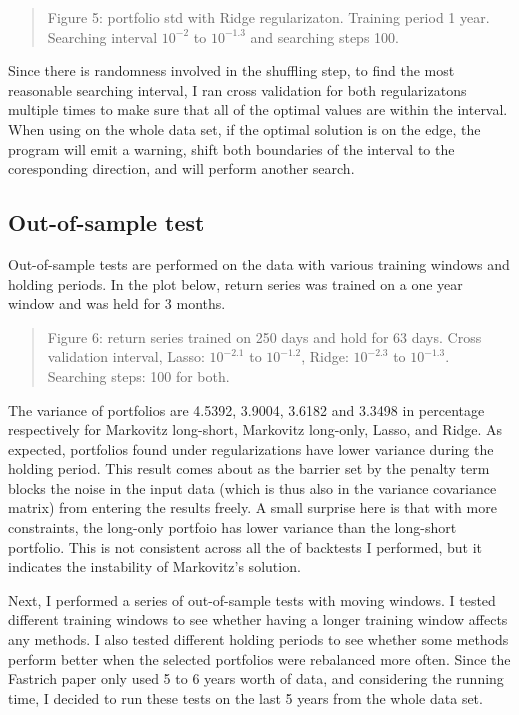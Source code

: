 \documentclass{article}
\newcommand{\ciapdf}[1]{\vspace*{-\parskip}\begin{center}\resizebox{0.75\textwidth}{!}{\texttt{[image: \#1]}}\end{center}}
\begin{document}
\begin{quote}
Figure 5: portfolio std with Ridge regularizaton. Training period 1 year. Searching
interval $10^{-2}$ to $10^{-1.3}$ and searching steps 100.
\end{quote}

Since there is randomness involved in the shuffling step, to find the most reasonable
searching interval, I ran cross validation for both regularizatons multiple times
to make sure that all of the optimal values are within the interval. When using on
the whole data set, if the optimal solution is on the edge, the program will
emit a warning, shift both boundaries of the interval to the coresponding
direction, and will perform another search.

\subsection*{Out-of-sample test}

Out-of-sample tests are performed on the data with various training windows and
holding periods. In the plot below, return series was trained on a one year
window and was held for 3 months.


\ciapdf{Figure_6T2.pdf}

\begin{quote}
Figure 6: return series trained on 250 days and hold for 63 days. Cross validation
interval, Lasso: $10^{-2.1}$ to $10^{-1.2}$, Ridge: $10^{-2.3}$ to $10^{-1.3}$.
Searching steps: 100 for both.
\end{quote}

The variance of portfolios are 4.5392, 3.9004, 3.6182 and 3.3498 in percentage
respectively
for Markovitz long-short, Markovitz long-only, Lasso, and Ridge. As expected,
portfolios found under regularizations have lower variance during the holding
period. This result comes about as the barrier set by the penalty term blocks
the noise in the input data (which is thus also in the variance covariance
matrix) from entering the results freely. A small surprise here is that with
more constraints, the long-only portfoio has lower variance than the long-short
portfolio. This is not consistent across all the of backtests I performed, but it
indicates the instability of Markovitz's solution.

Next, I performed a series of out-of-sample tests with moving windows. I tested
different training windows to see whether having a longer training window affects
any methods. I also tested different holding periods to see whether some methods
perform better when the selected portfolios were rebalanced more often. Since
the Fastrich paper only used 5 to 6 years worth of data, and considering the
running time, I
decided to run these tests on the last 5 years from the whole data set.
\end{document}
